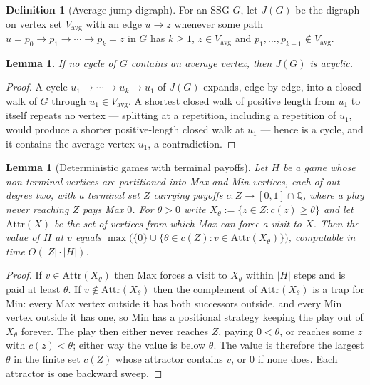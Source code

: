 \documentclass[11pt]{article}
\theoremstyle{plain}
\newtheorem{lemma}[theorem]{Lemma}
\theoremstyle{definition}
\newtheorem{definition}[theorem]{Definition}
\newcommand{\Vavg}{V_{\mathrm{avg}}}
\begin{document}
\begin{definition}[Average-jump digraph]\label{def:jump}
For an SSG $G$, let $J(G)$ be the digraph on vertex set $\Vavg$ with an
edge $u\to z$ whenever some path $u=p_0\to p_1\to\cdots\to p_k=z$ in $G$
has $k\ge1$, $z\in\Vavg$ and $p_1,\dots,p_{k-1}\notin\Vavg$.
\end{definition}

\begin{lemma}\label{lem:jump-acyclic}
If no cycle of $G$ contains an average vertex, then $J(G)$ is acyclic.
\end{lemma}

\begin{proof}
A cycle $u_1\to\cdots\to u_k\to u_1$ of $J(G)$ expands, edge by edge,
into a closed walk of $G$ through $u_1\in\Vavg$. A shortest closed walk
of positive length from $u_1$ to itself repeats no vertex --- splitting
at a repetition, including a repetition of $u_1$, would produce a shorter
positive-length closed walk at $u_1$ --- hence is a cycle, and it
contains the average vertex $u_1$, a contradiction.
\end{proof}

\begin{lemma}[Deterministic games with terminal payoffs]\label{lem:det-game}
Let $H$ be a game whose non-terminal vertices are partitioned into Max
and Min vertices, each of out-degree two, with a terminal set $Z$
carrying payoffs $c:Z\to[0,1]\cap\mathbb{Q}$, where a play never reaching
$Z$ pays Max $0$. For $\theta>0$ write
$X_\theta:=\{z\in Z:c(z)\ge\theta\}$ and let $\mathrm{Attr}(X)$ be the set
of vertices from which Max can force a visit to $X$. Then the value of
$H$ at $v$ equals
$\max\bigl(\{0\}\cup\{\theta\in c(Z):v\in\mathrm{Attr}(X_\theta)\}\bigr)$,
computable in time $O(|Z|\cdot|H|)$.
\end{lemma}

\begin{proof}
If $v\in\mathrm{Attr}(X_\theta)$ then Max forces a visit to $X_\theta$
within $|H|$ steps and is paid at least $\theta$. If
$v\notin\mathrm{Attr}(X_\theta)$ then the complement of
$\mathrm{Attr}(X_\theta)$ is a trap for Min: every Max vertex outside it
has both successors outside, and every Min vertex outside it has one, so
Min has a positional strategy keeping the play out of $X_\theta$ forever.
The play then either never reaches $Z$, paying $0<\theta$, or reaches
some $z$ with $c(z)<\theta$; either way the value is below $\theta$. The
value is therefore the largest $\theta$ in the finite set $c(Z)$ whose
attractor contains $v$, or $0$ if none does. Each attractor is one
backward sweep.
\end{proof}
\end{document}
